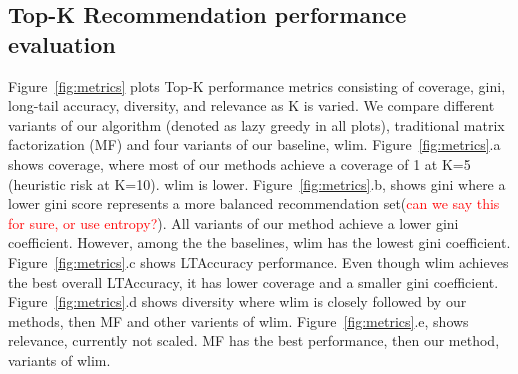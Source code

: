 

\subsection{Top-K Recommendation performance evaluation}
Figure~\ref{fig:metrics} plots Top-K performance metrics consisting of coverage, gini, long-tail accuracy, diversity, and relevance as K is varied. We compare different variants of our algorithm (denoted as lazy greedy in all plots), traditional matrix factorization (MF) and four variants of our baseline, wlim. 
Figure~\ref{fig:metrics}.a shows coverage, where most of our methods achieve a coverage of 1 at K=5 (heuristic risk at K=10). wlim is lower. 
Figure~\ref{fig:metrics}.b, shows gini where a lower gini score represents a more balanced recommendation set(\textcolor{red}{can we say this for sure, or use entropy?}). All variants of our method achieve a lower gini coefficient. However, among the the baselines, wlim  has the lowest gini coefficient. 
Figure~\ref{fig:metrics}.c shows LTAccuracy performance.  Even though wlim achieves the best overall LTAccuracy, it has lower coverage and a smaller gini coefficient. 
Figure~\ref{fig:metrics}.d shows diversity  where  wlim is closely followed by our methods, then MF and other varients of wlim. 
Figure~\ref{fig:metrics}.e, shows relevance, currently not scaled.  MF has the best performance, then our method, variants of wlim. 

\begin{figure*}[htb]
\centering
{}
\caption{Top-$K$ recommendation performance metrics vs $K$.}
\label{fig:metrics}
\end{figure*}
\fi
